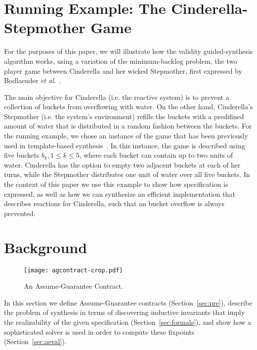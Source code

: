 \section{Running Example: The Cinderella-Stepmother Game}
\label{sec:example}

For the purposes of this paper, we will illustrate how the validity
guided-synthesis algorithm works, using a variation of the minimum-backlog
problem, the two player game between Cinderella and her wicked
Stepmother, first  expressed by Bodlaender \textit{et
al.}~\cite{bodlaender2012cinderella}.

The main objective for Cinderella (i.e. the reactive system) is to prevent a
collection of buckets from overflowing with water. On the other hand,
Cinderella's Stepmother (i.e. the system's environment) refills the buckets with a predifined amount of water that is distributed in a random fashion between the buckets.
For the running example, we chose an instance of the game that has been
previously used in template-based synthesis~\cite{beyene2014constraint}. In this instance, the game is described
using five buckets $b_k, 1 \leq k \leq 5$, where each bucket can contain up to two units of water.
Cinderella has the option to empty two adjacent buckets at each of her turns,
while the Stepmother distributes one unit of water over all five buckets. In the context of this paper we use this example to show how specification is expressed, as well as how we can synthesize an efficient implementation that describes reactions for Cinderella, such that an bucket overflow is always prevented.



\section{Background}
\label{sec:background}

\begin{figure}[!t]
\centering
\texttt{[image: agcontract-crop.pdf]}
\caption{An Assume-Guarantee Contract.}
\label{fg:agcontract}
\end{figure}


In this section we define Assume-Guarantee contracts (Section~\ref{sec:pre}),
describe the problem of synthesis in terms of discovering inductive invariants that imply the realizability of the given specification (Section~\ref{sec:formals}), and show how a sophisticated solver is used in order to compute these fixpoints (Section~\ref{sec:aeval}).

